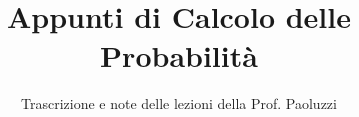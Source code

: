 \documentclass[a4paper,12pt]{article}
\title{Appunti di Calcolo delle Probabilità}
\author{Trascrizione e note delle lezioni della Prof. Paoluzzi}
\date{}
\begin{document}
\maketitle
\projectintro
\tableofcontents
\newpage

\end{document}
